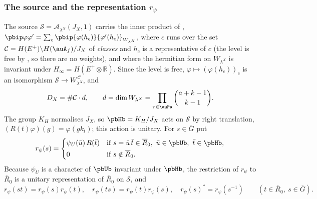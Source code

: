 \documentclass[10pt]{amsart}
\theoremstyle{definition}
\theoremstyle{remark}
\newcommand{\R}{\mathbb R}
\providecommand{\auDX}{D_X}
\providecommand{\auG}{\overline G}
\providecommand{\auS}{\mathcal S}
\providecommand{\pbR}{\overline R_0}
\providecommand{\pbrpsi}{r_\psi}
\begin{document}
\subsubsection*{The source and the representation \texorpdfstring{$\pbrpsi$}{r}}
The source $\auS=\mathcal A_{\lambda^X}(J_X,1)$ carries the inner product of
{\cite[\S14.3]{P46}}, $\pbip\varphi{\varphi'}=\sum_{c}\pbip{\varphi(h_c)}{\varphi'(h_c)}_{W_{\lambda^X}}$,
where $c$ runs over the set $\mathcal C=H(E^+)\backslash H(\auA_f)/J_X$ of \emph{classes} and $h_c$
is a representative of $c$ (the level is free by {\cite[Lemma~14.5]{P46}}, so there are no weights), and
where the hermitian form on $W_{\lambda^X}$ is invariant under $H_\infty=H(E^+\otimes\R)$. Since
the level is free, $\varphi\mapsto(\varphi(h_c))_c$ is an isomorphism $\auS\to W_{\lambda^X}^{\,
\mathcal C}$, and
\begin{equation}\label{pb:eq-DX}
\auDX=\#\mathcal C\cdot d,\qquad d=\dim W_{\lambda^X}=\prod_{\tau\in\auPa}\binom{a+k-1}{k-1}.
\end{equation}
The group $K_H$ normalises $J_X$, so $\pbHb=K_H/J_X$ acts on $\auS$ by right translation,
$(R(t)\varphi)(g)=\varphi(gk_t)$; this action is unitary. For $s\in\auG$ put
\[
\pbrpsi(s)=\begin{cases}\psi_U(\bar u)\,R(\bar t)&\text{if }s=\bar u\,\bar t\in\pbR,\
\bar u\in\pbUb,\ \bar t\in\pbHb,\\[2pt] 0&\text{if }s\notin\pbR.\end{cases}
\]
Because $\psi_U$ is a character of $\pbUb$ invariant under $\pbHb$, the restriction of $\pbrpsi$ to
$\pbR$ is a unitary representation of $\pbR$ on $\auS$, and
\begin{equation}\label{pb:eq-rext}
\pbrpsi(st)=\pbrpsi(s)\pbrpsi(t),\quad\pbrpsi(ts)=\pbrpsi(t)\pbrpsi(s),\quad\pbrpsi(s)^*=\pbrpsi
(s^{-1})\qquad(t\in\pbR,\ s\in\auG).
\end{equation}
\end{document}
